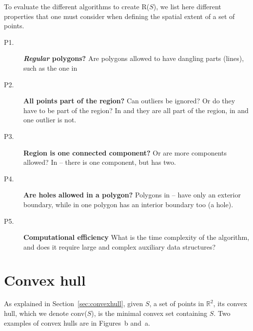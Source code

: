 To evaluate the different algorithms to create R($S$), we list here different properties that one must consider when defining the spatial extent of a set of points.
\begin{description}
  \item[P1.] \textbf{\emph{Regular} polygons?} Are polygons allowed to have dangling parts (lines), such as the one in 
  \item[P2.] \textbf{All points part of the region?} Can outliers be ignored? Or do they have to be part of the region? In  and  they are all part of the region, in  and  one outlier is not.
  \item[P3.] \textbf{Region is one connected component?} Or are more components allowed? In -- there is one component, but  has two.
  \item[P4.] \textbf{Are holes allowed in a polygon?} Polygons in -- have only an exterior boundary, while in  one polygon has an interior boundary too (a hole).
  \item[P5.] \textbf{Computational efficiency} What is the time complexity of the algorithm, and does it require large and complex auxiliary data structures?
\end{description}



%
\section{Convex hull}%
\label{sec:se_ch}

As explained in Section~\ref{sec:convexhull}, given $S$, a set of points in $\mathbb{R}^2$, its convex hull, which we denote conv($S$), is the minimal convex set containing $S$.
Two examples of convex hulls are in Figures~b and~a.

%

